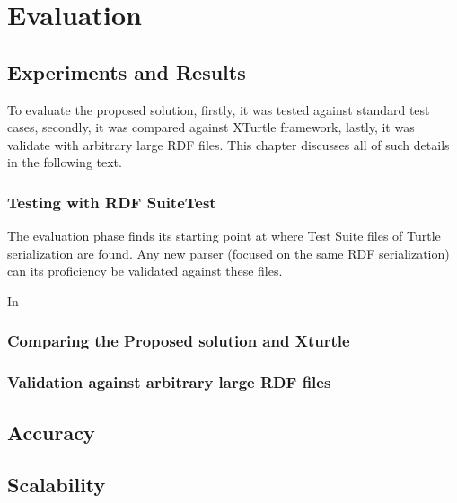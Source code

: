 \chapter{Evaluation}
\label{ch:evaluation}
\newpage

\section{Experiments and Results}
To evaluate the proposed solution, firstly, it was tested against standard test cases, secondly, it was compared against XTurtle framework, lastly, it was validate with arbitrary large RDF files. This chapter discusses all of such details in the following text. 


\subsection{Testing with RDF SuiteTest}
The evaluation phase finds its starting point at \citealp{TurtleTests:Online} where Test Suite files of Turtle serialization are found. Any new parser (focused on the same RDF serialization) can its proficiency be validated against these files. 

In  \citealp{TurtleTests:Online}      
\subsection{Comparing the Proposed solution and Xturtle}
\subsection{Validation against arbitrary large RDF files }

\section{Accuracy}

\section{Scalability}








